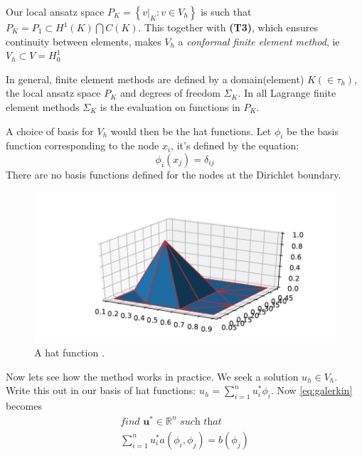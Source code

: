 \documentclass[../Main/main.tex]{subfiles}
\begin{document}
	\begin{remark}
	Our local ansatz space $P_K = \left \{ v|_K:v\in V_h \right \}$ is such that $P_K = P_1 \subset H^1(K) \bigcap C(K)$. This together with \textbf{(T3)}, which ensures continuity between elements, makes $V_h$ a \emph{conformal finite element method}, ie $V_h \subset V = H_0^1$
	\end{remark}
	\begin{remark}
		In general, finite element methods are defined by a domain(element) $K(\in \tau_h)$, the local ansatz space $P_K$ and degrees of freedom $\Sigma_K$. In all Lagrange finite element methods $\Sigma_K$ is the evaluation on functions in $P_K$.
	\end{remark}

	A choice of basis for $V_h$ would then be the hat functions.  Let $\phi_i$ be the basis function corresponding to the node $x_i$, it's defined by the equation:
	\begin{equation*}
		\phi_i(x_j) = \delta_{ij}
	\end{equation*}
	There are no basis functions defined for the nodes at the Dirichlet boundary.
	\begin{figure}[H]
		\centering
		\includegraphics[width=1\textwidth]{hat1.pdf}
		\caption{A hat function .}
		\label{fig:hat1}
	\end{figure}
	Now lets see how the method works in practice. We seek a solution $u_h \in V_h$. Write this out in our basis of hat functions: $u_h = \sum_{i=1}^n u_i^* \phi_i$. Now \eqref{eq:galerkin} becomes
	\begin{equation}\label{eq:fem system}
		\begin{gathered}
			\textit{find }\pmb{u}^*  \in \mathbb{R}^n \textit{ such that}\\
			\sum_{i=1}^n u_i^*  a(\phi_i,\phi_j) = b(\phi_j)
		\end{gathered}
	\end{equation}
\end{document}
